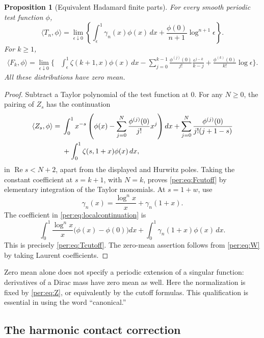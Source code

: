 \documentclass[11pt,letterpaper]{article}
\numberwithin{equation}{section}
\theoremstyle{plain}
\newtheorem{proposition}[theorem]{Proposition}
\theoremstyle{definition}
\theoremstyle{remark}
\begin{document}
\begin{proposition}[Equivalent Hadamard finite parts]
\label{per:prop:cutoffs}
For every smooth periodic test function $\phi$,
\begin{equation}\label{per:eq:Tcutoff}
 \langle T_n,\phi\rangle
 =\lim_{\epsilon\downarrow0}\left\{
   \int_\epsilon^1\gamma_n(x)\phi(x)\,dx
    +\frac{\phi(0)}{n+1}\log^{n+1}\epsilon\right\}.
\end{equation}
For $k\ge1$,
\begin{align}
 \langle F_k,\phi\rangle
 =\lim_{\epsilon\downarrow0}\biggl\{&
   \int_\epsilon^1\zeta(k+1,x)\phi(x)\,dx
   -\sum_{j=0}^{k-1}\frac{\phi^{(j)}(0)}{j!}
                       \frac{\epsilon^{j-k}}{k-j}
   +\frac{\phi^{(k)}(0)}{k!}\log\epsilon\biggr\}.
 \label{per:eq:Fcutoff}
\end{align}
All these distributions have zero mean.
\end{proposition}

\begin{proof}
Subtract a Taylor polynomial of the test function at $0$. For any
$N\ge0$, the pairing of $Z_s$ has the continuation
\begin{align}
 \langle Z_s,\phi\rangle={}&
 \int_0^1x^{-s}\left(\phi(x)-\sum_{j=0}^{N}
                         \frac{\phi^{(j)}(0)}{j!}x^j\right)dx
 +\sum_{j=0}^{N}\frac{\phi^{(j)}(0)}{j!(j+1-s)}\notag\\
 &+\int_0^1\zeta(s,1+x)\phi(x)\,dx,
 \label{per:eq:localcontinuation}
\end{align}
in $\operatorname{Re}s<N+2$, apart from the displayed and Hurwitz
poles. Taking the constant coefficient at $s=k+1$, with $N=k$,
proves \eqref{per:eq:Fcutoff} by elementary integration of the Taylor
monomials. At $s=1+w$, use
\[
 \gamma_n(x)=\frac{\log^n x}{x}+\gamma_n(1+x).
\]
The coefficient in \eqref{per:eq:localcontinuation} is
\[
 \int_0^1\frac{\log^n x}{x}\bigl(\phi(x)-\phi(0)\bigr)dx
 +\int_0^1\gamma_n(1+x)\phi(x)\,dx.
\]
This is precisely \eqref{per:eq:Tcutoff}. The zero-mean assertion
follows from \eqref{per:eq:W} by taking Laurent coefficients.
\end{proof}

Zero mean alone does not specify a periodic extension of a singular
function: derivatives of a Dirac mass have zero mean as well. Here the
normalization is fixed by \eqref{per:eq:Z}, or equivalently by the
cutoff formulas. This qualification is essential in using the word
``canonical.''

\subsection{The harmonic contact correction}
\end{document}
